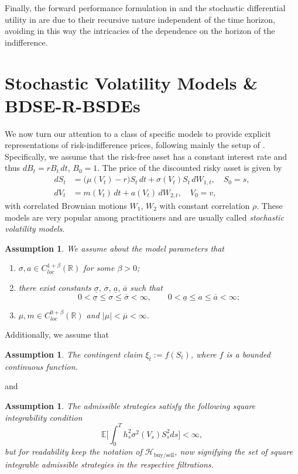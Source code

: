 \documentclass{article}
\newcommand{\R}{\mathbb{R}}
\newcommand{\E}{\mathbb{E}}
\newtheorem{assumption}[definition]{Assumption}
\begin{document}
Finally, the forward performance formulation in \cite{LSZ12} and the stochastic differential utility in \cite{YLY15} are due to their recursive nature independent of the time horizon, avoiding in this way the intricacies of the dependence on the horizon of the indifference.





\section{Stochastic Volatility Models \& BDSE-R-BSDEs}\label{sec:stochvol}

We now turn our attention to a class of specific models to provide explicit representations of risk-indifference prices, following mainly the setup of \cite{SS15}. Specifically, we assume that the risk-free asset has a constant interest rate and thus $dB_t = r B_t \, dt$, $B_0 =1$. The price of the discounted risky asset is given by 
\begin{align*}
	dS_t & = \bigl(\mu(V_t) -r \bigr)S_t\, dt + \sigma(V_t) S_t\, dW_{1,t}, \quad S_0 = s,\\
	dV_t &= m(V_t) \, dt +a(V_t) \, dW_{2,t}, \quad V_0 = v,
\end{align*}
with correlated Brownian motions $W_1$, $W_2$ with constant correlation $\rho$. These models are very popular among practitioners and are usually called \textit{stochastic volatility models}. 

\begin{assumption}\label{model_assmpn}
We assume about the model parameters that
\begin{enumerate}
\item $\sigma, a\in C^{1+\beta}_{loc}(\R)$ for some $\beta>0$; 
\item there exist constants $\underline{\sigma}, \,\overline{\sigma}, \,\underline{a}, \,\overline{a}$ such that
\[0<\underline{\sigma}\leq \sigma \leq \overline{\sigma}<\infty, \qquad 0<\underline{a}\leq a \leq \overline{a}<\infty;\]
\item $\mu, m \in C^{0+\beta}_{loc}(\R)$ and $|\mu|<\overline{\mu}<\infty$.\\
\end{enumerate}
\end{assumption}
Additionally, we assume that
\begin{assumption}\label{terminal_cond}
The contingent claim $\xi_t:= f(S_t)$, where $f$ is a bounded continuous function. %
\end{assumption}
and 
\begin{assumption}\label{square_cond}
The admissible strategies satisfy the following square integrability condition
\[\E \biggl[\int_0^T h_s^2\sigma^2(V_s) S_s^2 ds\biggr] <\infty,\]
but for readability keep the notation of $\mathcal{H}_\text{buy/sell}$, now signifying the set of square integrable admissible strategies in the respective filtrations.
\end{assumption}
\end{document}
